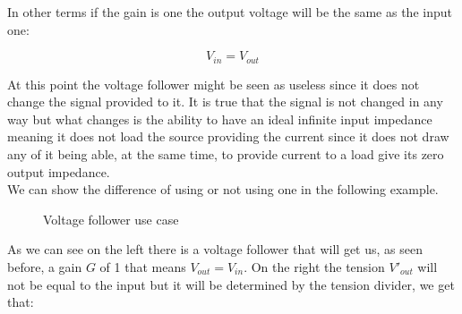 \documentclass[../main.tex]{subfiles}
\begin{document}
In other terms if the gain is one the output voltage will be the same as the input one:

\begin{equation}
	V_{in} = V_{out}
\end{equation}

At this point the voltage follower might be seen as useless since it does not change the signal provided to it. It is true that the signal is not changed in any way but what changes is the ability to have an ideal infinite input impedance meaning it does not load the source providing the current since it does not draw any of it being able, at the same time, to provide current to a load give its zero output impedance.\\

We can show the difference of using or not using one in the following example.

\begin{figure}[h!]
\begin{center}


\caption{Voltage follower use case}
\label{voltfoll}	
\end{center}
\end{figure} 

As we can see on the left there is a voltage follower that will get us, as seen before, a gain $G$ of 1 that means $V_{out} = V_{in}$.
On the right the tension $V'_{out}$ will not be equal to the input but it will be determined by the tension divider, we get that:
\end{document}
